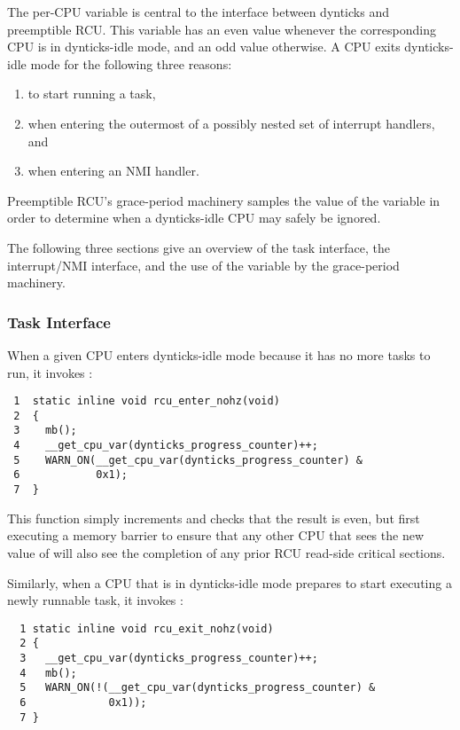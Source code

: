 The per-CPU  variable is
central to the interface between dynticks and preemptible RCU.
This variable has an even value whenever the corresponding CPU
is in dynticks-idle mode, and an odd value otherwise.
A CPU exits dynticks-idle mode for the following three reasons:

\begin{enumerate}
\item	to start running a task,
\item	when entering the outermost of a possibly nested set of interrupt
	handlers, and
\item	when entering an NMI handler.
\end{enumerate}

Preemptible RCU's grace-period machinery samples the value of
the  variable in order to
determine when a dynticks-idle CPU may safely be ignored.

The following three sections give an overview of the task
interface, the interrupt/NMI interface, and the use of
the  variable by the
grace-period machinery.

\subsubsection{Task Interface}
\label{sec:formal:Task Interface}

When a given CPU enters dynticks-idle mode because it has no more
tasks to run, it invokes :

{ \scriptsize
\begin{verbatim}
 1  static inline void rcu_enter_nohz(void)
 2  {
 3    mb();
 4    __get_cpu_var(dynticks_progress_counter)++;
 5    WARN_ON(__get_cpu_var(dynticks_progress_counter) &
 6            0x1);
 7  }
\end{verbatim}
}

This function simply increments  and
checks that the result is even, but first executing a memory barrier
to ensure that any other CPU that sees the new value of
 will also see the completion
of any prior RCU read-side critical sections.

Similarly, when a CPU that is in dynticks-idle mode prepares to
start executing a newly runnable task, it invokes
:

{ \scriptsize
\begin{verbatim}
  1 static inline void rcu_exit_nohz(void)
  2 {
  3   __get_cpu_var(dynticks_progress_counter)++;
  4   mb();
  5   WARN_ON(!(__get_cpu_var(dynticks_progress_counter) &
  6             0x1));
  7 }
\end{verbatim}
}

